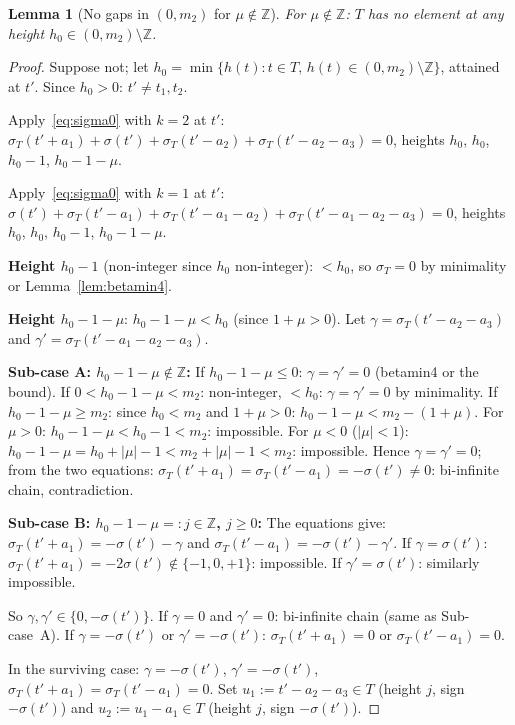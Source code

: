 \documentclass{article}
\newtheorem{lemma}{Lemma}
\begin{document}
\begin{lemma}[No gaps in $(0,m_2)$ for $\mu\notin\mathbb Z$]\label{lem:nogaps}
For $\mu\notin\mathbb{Z}$\textup{:}
$T$ has no element at any height $h_0\in(0,m_2)\setminus\mathbb{Z}$.
\end{lemma}
\begin{proof}
Suppose not; let $h_0=\min\{h(t):t\in T,\,h(t)\in(0,m_2)\setminus\mathbb{Z}\}$, attained at $t'$.
Since $h_0>0$: $t'\ne t_1,t_2$.

Apply~\eqref{eq:sigma0} with $k=2$ at $t'$:
$\sigma_T(t'+a_1)+\sigma(t')+\sigma_T(t'-a_2)+\sigma_T(t'-a_2-a_3)=0$,
heights $h_0$, $h_0$, $h_0-1$, $h_0-1-\mu$.

Apply~\eqref{eq:sigma0} with $k=1$ at $t'$:
$\sigma(t')+\sigma_T(t'-a_1)+\sigma_T(t'-a_1-a_2)+\sigma_T(t'-a_1-a_2-a_3)=0$,
heights $h_0$, $h_0$, $h_0-1$, $h_0-1-\mu$.

\textbf{Height $h_0-1$} (non-integer since $h_0$ non-integer): $<h_0$, so $\sigma_T=0$ by minimality or Lemma~\ref{lem:betamin4}.

\textbf{Height $h_0-1-\mu$}: $h_0-1-\mu<h_0$ (since $1+\mu>0$).  Let $\gamma=\sigma_T(t'-a_2-a_3)$ and $\gamma'=\sigma_T(t'-a_1-a_2-a_3)$.

\textbf{Sub-case A: $h_0-1-\mu\notin\mathbb Z$:}
If $h_0-1-\mu\le 0$: $\gamma=\gamma'=0$ (betamin4 or the bound).
If $0<h_0-1-\mu<m_2$: non-integer, $<h_0$: $\gamma=\gamma'=0$ by minimality.
If $h_0-1-\mu\ge m_2$: since $h_0<m_2$ and $1+\mu>0$: $h_0-1-\mu<m_2-(1+\mu)$.
For $\mu>0$: $h_0-1-\mu<h_0-1<m_2$: impossible.
For $\mu<0$ ($|\mu|<1$): $h_0-1-\mu=h_0+|\mu|-1<m_2+|\mu|-1<m_2$: impossible.
Hence $\gamma=\gamma'=0$; from the two equations: $\sigma_T(t'+a_1)=\sigma_T(t'-a_1)=-\sigma(t')\ne 0$:
bi-infinite chain, contradiction.

\textbf{Sub-case B: $h_0-1-\mu=:j\in\mathbb Z$, $j\ge 0$:}
The equations give:
$\sigma_T(t'+a_1)=-\sigma(t')-\gamma$ and $\sigma_T(t'-a_1)=-\sigma(t')-\gamma'$.
If $\gamma=\sigma(t')$: $\sigma_T(t'+a_1)=-2\sigma(t')\notin\{-1,0,+1\}$: impossible.
If $\gamma'=\sigma(t')$: similarly impossible.

So $\gamma,\gamma'\in\{0,-\sigma(t')\}$.
If $\gamma=0$ and $\gamma'=0$: bi-infinite chain (same as Sub-case~A).
If $\gamma=-\sigma(t')$ or $\gamma'=-\sigma(t')$: $\sigma_T(t'+a_1)=0$ or $\sigma_T(t'-a_1)=0$.

In the surviving case: $\gamma=-\sigma(t')$, $\gamma'=-\sigma(t')$,
$\sigma_T(t'+a_1)=\sigma_T(t'-a_1)=0$.
Set $u_1:=t'-a_2-a_3\in T$ (height $j$, sign $-\sigma(t')$) and
$u_2:=u_1-a_1\in T$ (height $j$, sign $-\sigma(t')$).


\end{proof}
\end{document}

